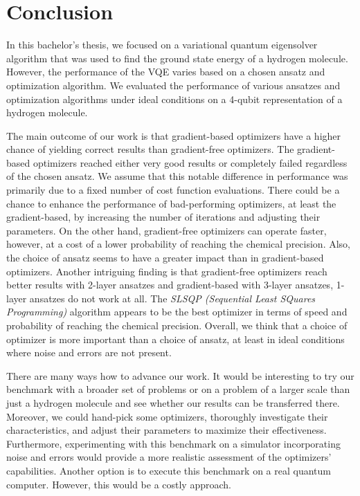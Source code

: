 \chapter*{Conclusion}
In this bachelor's thesis, we focused on a variational quantum eigensolver algorithm that was used to find the ground state energy of a hydrogen molecule. However, the performance of the VQE varies based on a chosen ansatz and optimization algorithm. We evaluated the performance of various ansatzes and optimization algorithms under ideal conditions on a 4-qubit representation of a hydrogen molecule.

The main outcome of our work is that gradient-based optimizers have a higher chance of yielding correct results than gradient-free optimizers. The gradient-based optimizers reached either very good results or completely failed regardless of the chosen ansatz. We assume that this notable difference in performance was primarily due to a fixed number of cost function evaluations. There could be a chance to enhance the performance of bad-performing optimizers, at least the gradient-based, by increasing the number of iterations and adjusting their parameters. On the other hand, gradient-free optimizers can operate faster, however, at a cost of a lower probability of reaching the chemical precision. Also, the choice of ansatz seems to have a greater impact than in gradient-based optimizers. Another intriguing finding is that gradient-free optimizers reach better results with 2-layer ansatzes and gradient-based with 3-layer ansatzes, 1-layer ansatzes do not work at all. The \textit{SLSQP (Sequential Least SQuares Programming)} algorithm appears to be the best optimizer in terms of speed and probability of reaching the chemical precision. Overall, we think that a choice of optimizer is more important than a choice of ansatz, at least in ideal conditions where noise and errors are not present.
    
There are many ways how to advance our work. It would be interesting to try our benchmark with a broader set of problems or on a problem of a larger scale than just a hydrogen molecule and see whether our results can be transferred there. Moreover, we could hand-pick some optimizers, thoroughly investigate their characteristics, and adjust their parameters to maximize their effectiveness. Furthermore, experimenting with this benchmark on a simulator incorporating noise and errors would provide a more realistic assessment of the optimizers' capabilities. Another option is to execute this benchmark on a real quantum computer. However, this would be a costly approach.